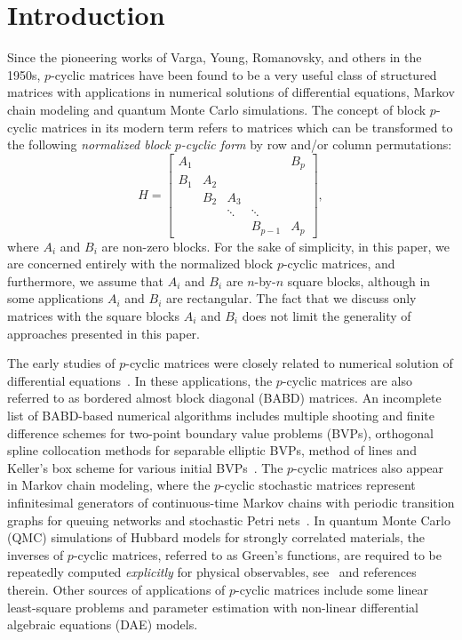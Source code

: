 \documentclass{llncs}
\begin{document}
\section{Introduction}

Since the pioneering works of
Varga, Young, Romanovsky, and others in the 1950s, %
$p$-cyclic matrices
have been found to be a very useful class of structured matrices
with applications in numerical solutions of differential equations, 
Markov chain modeling and quantum Monte Carlo simulations. 
The concept of block $p$-cyclic matrices
in its modern term refers to matrices which can be
transformed to the following \emph{normalized block $p$-cyclic form} 
by row and/or column permutations: 
\begin{equation} \label{eq:matr_A}
  H =
  \begin{bmatrix}
    A_1 &    &    &  & B_p   \\
    B_1 & A_2 &    &  &  \\
        & B_2 & A_3 &  &     \\
            &        & \ddots & \ddots &         \\
        &     &          & B_{p-1} & A_p
  \end{bmatrix}
  ,
\end{equation}
where $A_i$ and $B_i$ are non-zero blocks.
For the sake of simplicity, in this paper,
we are concerned entirely with the {normalized block $p$-cyclic matrices},
and furthermore, we assume that 
$A_i$ and $B_i$ are $n$-by-$n$ square blocks, although
in some applications $A_i$ and $B_i$ are rectangular.
The fact that we discuss only matrices with the square blocks $A_i$ and $B_i$
does not limit the generality of approaches presented in this paper.

The early studies of $p$-cyclic matrices 
were closely related to numerical solution of differential 
equations~\cite{Wright93,Wright92BSOF,Fairweather04}.
In these applications, the $p$-cyclic matrices are also 
referred to as bordered almost block diagonal 
(BABD) matrices.  An incomplete list of 
BABD-based numerical algorithms includes multiple shooting 
and finite difference schemes for two-point boundary value problems (BVPs),
orthogonal spline collocation methods for separable elliptic BVPs, 
method of lines and Keller's box scheme for various initial 
BVPs~\cite{Wright92BSOF,Fairweather04}.
%
The $p$-cyclic matrices also appear in 
Markov chain modeling, where the $p$-cyclic stochastic 
matrices represent infinitesimal generators of continuous-time 
Markov chains with periodic transition graphs for queuing networks 
and stochastic Petri nets~\cite{Ernst00}. %
%
In quantum Monte Carlo (QMC) simulations of Hubbard models for
strongly correlated materials,
the inverses of $p$-cyclic matrices, referred to as Green's functions, 
are required to be repeatedly computed {\em explicitly} for 
physical observables, see~\cite{Bai09,Tomas12} and references therein. %
Other sources of applications of $p$-cyclic matrices include
some linear least-square problems and parameter estimation with 
non-linear differential algebraic equations (DAE) models.
\end{document}
